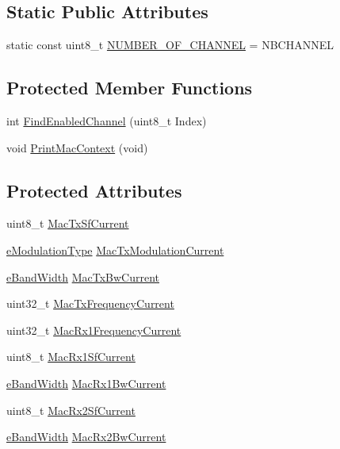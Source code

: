 \subsection*{Static Public Attributes}
\begin{DoxyCompactItemize}
\item 
static const uint8\+\_\+t \mbox{\hyperlink{class_lora_wan_container_aa9219b0dc784ae044e3e1a0dcd305e53}{N\+U\+M\+B\+E\+R\+\_\+\+O\+F\+\_\+\+C\+H\+A\+N\+N\+EL}} = N\+B\+C\+H\+A\+N\+N\+EL
\end{DoxyCompactItemize}
\subsection*{Protected Member Functions}
\begin{DoxyCompactItemize}
\item 
int \mbox{\hyperlink{class_lora_wan_container_af7ea3417212b3e06475635e3d392baf2}{Find\+Enabled\+Channel}} (uint8\+\_\+t Index)
\item 
void \mbox{\hyperlink{class_lora_wan_container_a8d38cb16e6bf161520e396457d7194c4}{Print\+Mac\+Context}} (void)
\end{DoxyCompactItemize}
\subsection*{Protected Attributes}
\begin{DoxyCompactItemize}
\item 
uint8\+\_\+t \mbox{\hyperlink{class_lora_wan_container_a22b5a7290fac2cc6886d22ef153770f4}{Mac\+Tx\+Sf\+Current}}
\item 
\mbox{\hyperlink{_define_8h_a81bbaee3ae5a0ec0040b6faedbf80b2f}{e\+Modulation\+Type}} \mbox{\hyperlink{class_lora_wan_container_ad89ce469ad5978798e5c518755b6d005}{Mac\+Tx\+Modulation\+Current}}
\item 
\mbox{\hyperlink{_define_8h_a6cbb491180e131f374cdbe63880c85e1}{e\+Band\+Width}} \mbox{\hyperlink{class_lora_wan_container_a4b6a8445c09566ca796131333befeaa4}{Mac\+Tx\+Bw\+Current}}
\item 
uint32\+\_\+t \mbox{\hyperlink{class_lora_wan_container_af7ca1638efc2891332a2fe863ea1c8b3}{Mac\+Tx\+Frequency\+Current}}
\item 
uint32\+\_\+t \mbox{\hyperlink{class_lora_wan_container_a64f1c2eaa197dc30eb86d13560aabb32}{Mac\+Rx1\+Frequency\+Current}}
\item 
uint8\+\_\+t \mbox{\hyperlink{class_lora_wan_container_a7f5c5940cbc0181dc85138b609200c93}{Mac\+Rx1\+Sf\+Current}}
\item 
\mbox{\hyperlink{_define_8h_a6cbb491180e131f374cdbe63880c85e1}{e\+Band\+Width}} \mbox{\hyperlink{class_lora_wan_container_a8a9873a1e1bde19470d537abf936e30c}{Mac\+Rx1\+Bw\+Current}}
\item 
uint8\+\_\+t \mbox{\hyperlink{class_lora_wan_container_a513daf6bfa05b4f3bac7b9c8184f41cd}{Mac\+Rx2\+Sf\+Current}}
\item 
\mbox{\hyperlink{_define_8h_a6cbb491180e131f374cdbe63880c85e1}{e\+Band\+Width}} \mbox{\hyperlink{class_lora_wan_container_a46ef5fbb867c21b657be7071a6413923}{Mac\+Rx2\+Bw\+Current}}
\end{DoxyCompactItemize}


